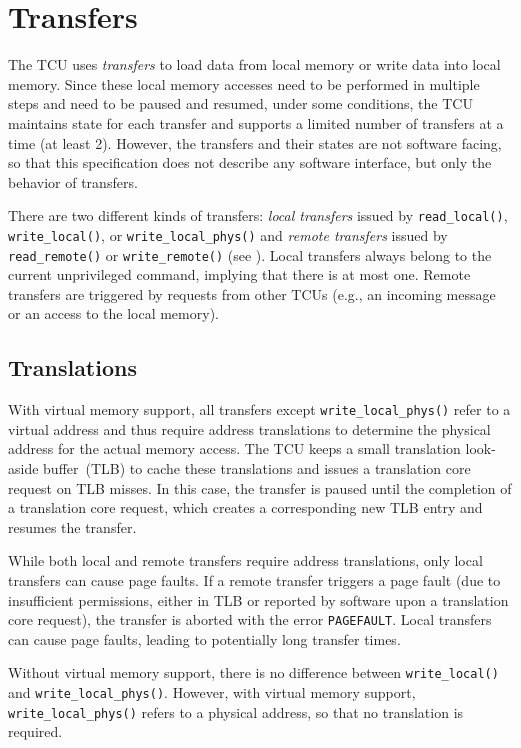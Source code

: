 \chapter{Transfers}

The TCU uses \emph{transfers} to load data from local memory or write data into local memory. Since
these local memory accesses need to be performed in multiple steps and need to be paused and
resumed\colorbox{vm}{, under some conditions,} the TCU maintains state for each transfer and
supports a limited number of transfers at a time (at least 2). However, the transfers and their
states are not software facing, so that this specification does not describe any software interface,
but only the behavior of transfers.

There are two different kinds of transfers: \emph{local transfers} issued by \texttt{read\_local()},
\texttt{write\_local()}, or \texttt{write\_local\_phys()} and \emph{remote transfers} issued by
\texttt{read\_remote()} or \texttt{write\_remote()} (see ). Local
transfers always belong to the current unprivileged command, implying that there is at most one.
Remote transfers are triggered by requests from other TCUs (e.g., an incoming message or an access
to the local memory).

\section{Translations}
\label{sec:xlates}

With virtual memory support, all transfers except \texttt{write\_local\_phys()} refer to a virtual
address and thus require address translations to determine the physical address for the actual
memory access. The TCU keeps a small translation look-aside buffer~(TLB) to cache these translations
and issues a translation core request on TLB misses. In this case, the transfer is paused until the
completion of a translation core request, which creates a corresponding new TLB entry and resumes
the transfer.

While both local and remote transfers require address translations, only local transfers can cause
page faults. If a remote transfer triggers a page fault (due to insufficient permissions, either in
TLB or reported by software upon a translation core request), the transfer is aborted with the error
\texttt{PAGEFAULT}. Local transfers can cause page faults, leading to potentially long transfer
times.

Without virtual memory support, there is no difference between \texttt{write\_local()} and
\texttt{write\_local\_phys()}. However, with virtual memory support, \texttt{write\_local\_phys()}
refers to a physical address, so that no translation is required.

